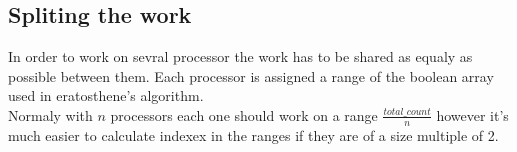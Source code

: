 \subsection{Spliting the work}

In order to work on sevral processor the work has to be shared as equaly as possible between them. Each processor is assigned a range of the boolean array used in eratosthene's algorithm.\\Normaly with $n$ processors each one should work on a range $\frac{total\_count}{n}$ however it's much easier to calculate indexex in the ranges if they are of a size multiple of 2. 



